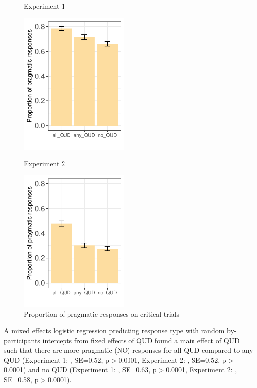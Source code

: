 \documentclass[12pt]{article}
\begin{document}
\begin{figure}[!ht]  
\begin{minipage}{.5\textwidth}
    \caption*{Experiment 1}
    \includegraphics[height=7cm]{img/exp4_proportion_pragmatic.pdf}    
    \end{minipage}%
\begin{minipage}{.5\textwidth}
    \caption*{Experiment 2}
    \includegraphics[height=7cm]{img/exp5_proportion_pragmatic.pdf}
    \end{minipage}%
    \caption{Proportion of pragmatic responses on critical trials}
\end{figure}

 A mixed effects logistic regression predicting response type with random by-participants intercepts from fixed effects of QUD found a main effect of QUD such that there are more pragmatic (NO) responses for all QUD compared to any QUD (Experiment 1: , SE=0.52, p$>$0.0001, Experiment 2: , SE=0.52, p$>$0.0001) and no QUD (Experiment 1: , SE=0.63, p$>$0.0001, Experiment 2: , SE=0.58, p$>$0.0001).
\end{document}
